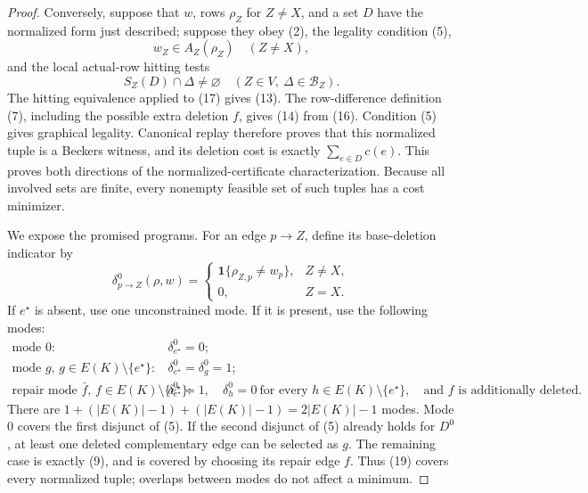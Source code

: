 \documentclass{article}
\begin{document}
\begin{proof}
Conversely, suppose that \(w\), rows \(\rho_Z\) for \(Z\ne X\), and a set \(D\) have the normalized form just described; suppose they obey (2), the legality condition (5),
\[
 w_Z\in A_Z(\rho_Z)\quad(Z\ne X),                                   \tag{16}
\]
and the local actual-row hitting tests
\[
 S_Z(D)\cap\Delta\ne\varnothing
 \quad(Z\in V,\ \Delta\in\mathcal B_Z).                            \tag{17}
\]
The hitting equivalence applied to (17) gives (13).  The row-difference definition (7), including the possible extra deletion \(f\), gives (14) from (16).  Condition (5) gives graphical legality.  Canonical replay therefore proves that this normalized tuple is a Beckers witness, and its deletion cost is exactly \(\sum_{e\in D}c(e)\).  This proves both directions of the normalized-certificate characterization.  Because all involved sets are finite, every nonempty feasible set of such tuples has a cost minimizer.

We expose the promised programs.  For an edge \(p\to Z\), define its base-deletion indicator by
\[
 \delta^0_{p\to Z}(\rho,w)
 =
 \begin{cases}
  \mathbf 1\{\rho_{Z,p}\ne w_p\},&Z\ne X,\\
  0,&Z=X.
 \end{cases}                                                          \tag{18}
\]
If \(e^\star\) is absent, use one unconstrained mode.  If it is present, use the following modes:
\[
\begin{array}{ll}
\text{mode \(0\):}&\delta^0_{e^\star}=0;\\[2pt]
\text{mode \(g\), \(g\in E(K)\setminus\{e^\star\}\):}
 &\delta^0_{e^\star}=\delta^0_g=1;\\[2pt]
\text{repair mode \(\bar f\), \(f\in E(K)\setminus\{e^\star\}\):}
 &\delta^0_{e^\star}=1,\quad
   \delta^0_h=0\ \text{for every }h\in E(K)\setminus\{e^\star\},
   \quad\text{and }f\text{ is additionally deleted.}
\end{array}                                                            \tag{19}
\]
There are \(1+(|E(K)|-1)+(|E(K)|-1)=2|E(K)|-1\) modes.  Mode \(0\) covers the first disjunct of (5).  If the second disjunct of (5) already holds for \(D^0\), at least one deleted complementary edge can be selected as \(g\).  The remaining case is exactly (9), and is covered by choosing its repair edge \(f\).  Thus (19) covers every normalized tuple; overlaps between modes do not affect a minimum.


\end{proof}
\end{document}
